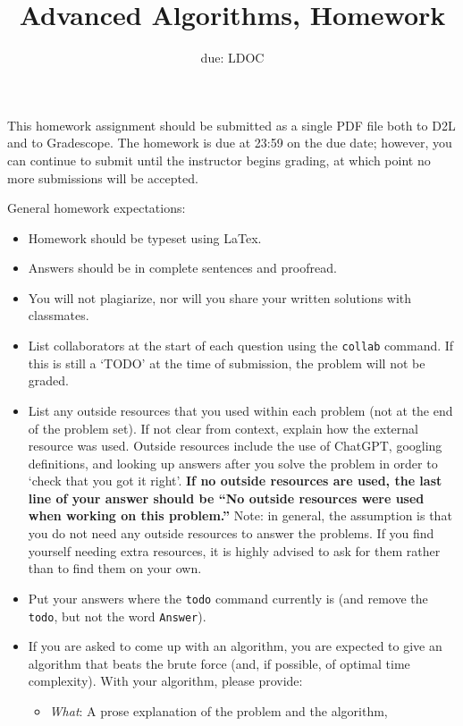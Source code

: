 \documentclass{article}
\title{Advanced Algorithms, Homework \hwnum}
\author{\todo{Your Name Here}}
\date{due: LDOC}
\begin{document}
\maketitle

This homework assignment should be
submitted as a single PDF file both to D2L and to Gradescope.  The homework is
due at 23:59 on the due date; however, you can continue to submit until the
instructor begins grading, at which point no more submissions will be accepted.

General homework expectations:
\begin{itemize}
    \item Homework should be typeset using LaTex.
    \item Answers should be in complete sentences and proofread.
    \item You will not plagiarize, nor will you share your written solutions
        with classmates.
    \item List collaborators at the start of each question using the
        \texttt{collab} command. If this is still a `TODO' at the time of
        submission, the problem will not
        be graded.
    \item List any outside resources that you used within each problem (not at
        the end of the problem set). If not clear from context, explain how the
        external resource was used.  Outside resources include the use of
        ChatGPT, googling definitions, and looking up answers after you solve
        the problem in order to `check that you got it right'.  {\bf If no outside resources are
        used, the last line of your answer should be ``No outside resources were
        used when working on this problem.''}  Note: in general, the assumption
        is that you do not need any outside resources to answer the problems.
        If you find yourself needing extra resources, it is highly advised to
        ask for them rather than to find them on your own.
    \item Put your answers where the \texttt{todo} command currently is (and
        remove the \texttt{todo}, but not the word \texttt{Answer}).
    \item If you are asked to come up with an algorithm, you are
        expected to give an algorithm that beats the brute force (and, if possible, of
        optimal time complexity). With your algorithm, please provide:
        \begin{itemize}
            \item \emph{What}: A prose explanation of the problem and the algorithm,

\end{itemize}
\end{itemize}
\end{document}
